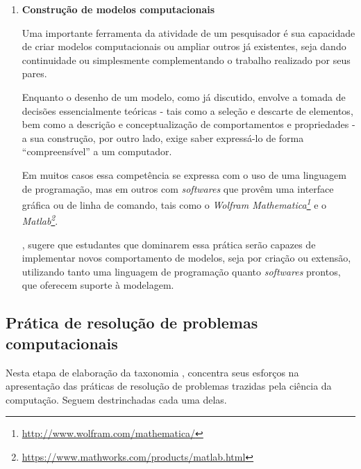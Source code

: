 \begin{enumerate}
  \item \textbf{Construção de modelos computacionais}

  Uma importante ferramenta da atividade de um pesquisador é sua capacidade de criar modelos computacionais ou ampliar outros já existentes, seja dando continuidade ou simplesmente complementando o trabalho realizado por seus pares. 

  Enquanto o desenho de um modelo, como já discutido, envolve a tomada de decisões essencialmente teóricas - tais como a seleção e descarte de elementos, bem como a descrição e conceptualização de comportamentos e propriedades - a sua construção, por outro lado, exige saber expressá-lo de forma ``compreensível'' a um computador. 
  
  Em muitos casos essa competência se expressa com o uso de uma linguagem de programação, mas em outros com \textit{softwares} que provêm uma interface gráfica ou de linha de comando, tais como o \textit{Wolfram Mathematica\footnote{\href{http://www.wolfram.com/mathematica/}{http://www.wolfram.com/mathematica/} }} e o \textit{Matlab\footnote{\href{https://www.mathworks.com/products/matlab.html}{https://www.mathworks.com/products/matlab.html}}}.

  , sugere que estudantes que dominarem essa prática serão capazes de implementar novos comportamento de modelos, seja por criação ou extensão, utilizando tanto uma linguagem de programação quanto \textit{softwares} prontos, que oferecem suporte à modelagem.
\end{enumerate}

\subsection{Prática de resolução de problemas computacionais}

Nesta etapa de elaboração da taxonomia , concentra seus esforços na apresentação das práticas de resolução de problemas trazidas pela ciência da computação. Seguem destrinchadas cada uma delas. 

